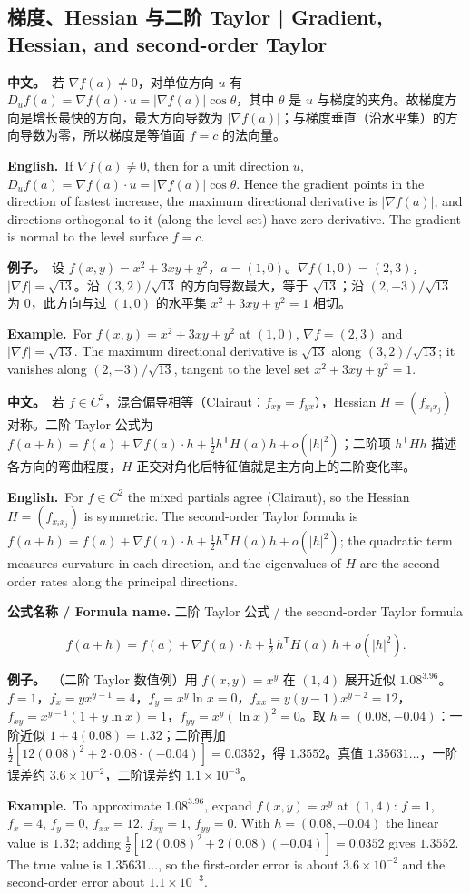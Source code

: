 \documentclass[UTF8,11pt,a4paper]{ctexart}
\newcommand{\BOTH}[2]{\par\noindent\textbf{中文。}\ #1\par\noindent\textbf{English.}\ #2\par}
\newcommand{\EX}[2]{\par\noindent\textbf{例子。}\ #1\par\noindent\textbf{Example.}\ #2\par}
\newcommand{\FORMULA}[2]{\par\noindent\textbf{公式名称 / Formula name.} #1 / #2\par}
\begin{document}
\subsection{梯度、Hessian 与二阶 Taylor | Gradient, Hessian, and second-order Taylor}
\BOTH{若 $\nabla f(a)\ne0$，对单位方向 $u$ 有 $D_uf(a)=\nabla f(a)\cdot u=|\nabla f(a)|\cos\theta$，其中 $\theta$ 是 $u$ 与梯度的夹角。故梯度方向是增长最快的方向，最大方向导数为 $|\nabla f(a)|$；与梯度垂直（沿水平集）的方向导数为零，所以梯度是等值面 $f=c$ 的法向量。}{If $\nabla f(a)\ne0$, then for a unit direction $u$, $D_uf(a)=\nabla f(a)\cdot u=|\nabla f(a)|\cos\theta$. Hence the gradient points in the direction of fastest increase, the maximum directional derivative is $|\nabla f(a)|$, and directions orthogonal to it (along the level set) have zero derivative. The gradient is normal to the level surface $f=c$.}
\EX{设 $f(x,y)=x^2+3xy+y^2$，$a=(1,0)$。$\nabla f(1,0)=(2,3)$，$|\nabla f|=\sqrt{13}$。沿 $(3,2)/\sqrt{13}$ 的方向导数最大，等于 $\sqrt{13}$；沿 $(2,-3)/\sqrt{13}$ 为 $0$，此方向与过 $(1,0)$ 的水平集 $x^2+3xy+y^2=1$ 相切。}{For $f(x,y)=x^2+3xy+y^2$ at $(1,0)$, $\nabla f=(2,3)$ and $|\nabla f|=\sqrt{13}$. The maximum directional derivative is $\sqrt{13}$ along $(3,2)/\sqrt{13}$; it vanishes along $(2,-3)/\sqrt{13}$, tangent to the level set $x^2+3xy+y^2=1$.}
\BOTH{若 $f\in C^2$，混合偏导相等（Clairaut：$f_{xy}=f_{yx}$），Hessian $H=(f_{x_ix_j})$ 对称。二阶 Taylor 公式为 $f(a+h)=f(a)+\nabla f(a)\cdot h+\frac12h^{\mathsf T}H(a)h+o(|h|^2)$；二阶项 $h^{\mathsf T}Hh$ 描述各方向的弯曲程度，$H$ 正交对角化后特征值就是主方向上的二阶变化率。}{For $f\in C^2$ the mixed partials agree (Clairaut), so the Hessian $H=(f_{x_ix_j})$ is symmetric. The second-order Taylor formula is $f(a+h)=f(a)+\nabla f(a)\cdot h+\frac12h^{\mathsf T}H(a)h+o(|h|^2)$; the quadratic term measures curvature in each direction, and the eigenvalues of $H$ are the second-order rates along the principal directions.}
\FORMULA{二阶 Taylor 公式}{the second-order Taylor formula}
\[
f(a+h)=f(a)+\nabla f(a)\cdot h+\tfrac12\,h^{\mathsf T}H(a)\,h+o(|h|^2).
\]
\EX{（二阶 Taylor 数值例）用 $f(x,y)=x^y$ 在 $(1,4)$ 展开近似 $1.08^{3.96}$。$f=1$，$f_x=yx^{y-1}=4$，$f_y=x^y\ln x=0$，$f_{xx}=y(y-1)x^{y-2}=12$，$f_{xy}=x^{y-1}(1+y\ln x)=1$，$f_{yy}=x^y(\ln x)^2=0$。取 $h=(0.08,-0.04)$：一阶近似 $1+4(0.08)=1.32$；二阶再加 $\frac12[12(0.08)^2+2\cdot0.08\cdot(-0.04)]=0.0352$，得 $1.3552$。真值 $1.35631\ldots$，一阶误差约 $3.6\times10^{-2}$，二阶误差约 $1.1\times10^{-3}$。}{To approximate $1.08^{3.96}$, expand $f(x,y)=x^y$ at $(1,4)$: $f=1$, $f_x=4$, $f_y=0$, $f_{xx}=12$, $f_{xy}=1$, $f_{yy}=0$. With $h=(0.08,-0.04)$ the linear value is $1.32$; adding $\frac12[12(0.08)^2+2(0.08)(-0.04)]=0.0352$ gives $1.3552$. The true value is $1.35631\ldots$, so the first-order error is about $3.6\times10^{-2}$ and the second-order error about $1.1\times10^{-3}$.}
\end{document}
